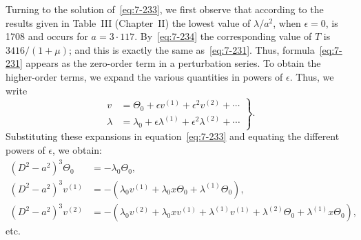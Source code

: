 Turning to the solution of~\eqref{eq:7-233}, we first observe that according to
the results given in Table~III (Chapter~II) the lowest value of $\lambda/a^2$,
when $\epsilon = 0$, is 1708 and occurs for $a = 3{\cdot}117$.  By~\eqref{eq:7-234} the corresponding value of $T$ is $3416/(1+\mu)$; and this is exactly the same as~\eqref{eq:7-231}.
Thus, formula~\eqref{eq:7-231} appears as the zero-order term in a perturbation
series.  To obtain the higher-order terms, we expand the various quantities in powers of $\epsilon$.  Thus, we write
\begin{equation}
\label{eq:7-240}
\left.\begin{aligned}
v &= \Theta_0+\epsilon v^{(1)}+\epsilon^2 v^{(2)}+\cdots\\
\lambda &= \lambda_0+\epsilon\lambda^{(1)}+\epsilon^2\lambda^{(2)}+\cdots
\end{aligned}\right\}.
\end{equation}
Substituting these expansions in equation~\eqref{eq:7-233} and equating the
different powers of $\epsilon$, we obtain:
\begin{align}
\label{eq:7-241}
(D^2-a^2)^3 \Theta_0 &= -\lambda_0\Theta_0, \\
\label{eq:7-242}
(D^2-a^2)^3 v^{(1)} &= -(\lambda_0 v^{(1)}+\lambda_0 x\Theta_0+\lambda^{(1)}\Theta_0), \\
\label{eq:7-243}
(D^2-a^2)^3 v^{(2)} &= -(\lambda_0 v^{(2)}+\lambda_0 xv^{(1)}+\lambda^{(1)} v^{(1)}
+\lambda^{(2)}\Theta_0+\lambda^{(1)}x\Theta_0),
\end{align}
etc.

